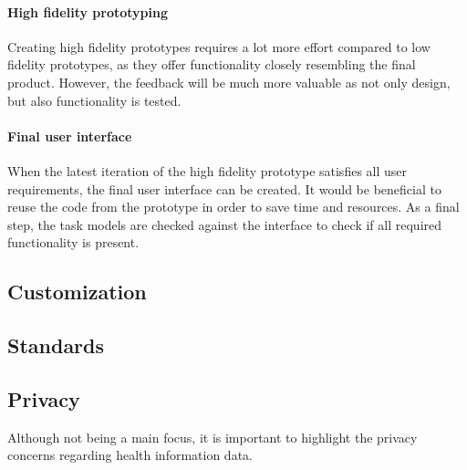         \paragraph{High fidelity prototyping} Creating high fidelity prototypes requires a lot more effort compared to low fidelity prototypes, as they offer functionality closely resembling the final product. However, the feedback will be much more valuable as not only design, but also functionality is tested.

        \paragraph{Final user interface} When the latest iteration of the high fidelity prototype satisfies all user requirements, the final user interface can be created. It would be beneficial to reuse the code from the prototype in order to save time and resources. As a final step, the task models are checked against the interface to check if all required functionality is present.\\


    \subsection{Customization}

    \subsection{Standards} \label{2_standards}

    \subsection{Privacy}
    Although not being a main focus, it is important to highlight the privacy concerns regarding health information data.

    

        

        


